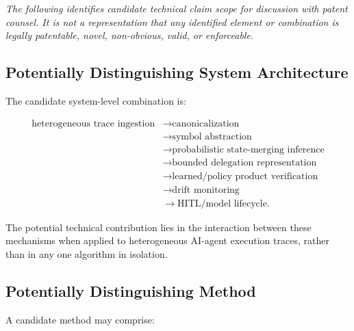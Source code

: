 \documentclass[11pt,a4paper]{article}
\newenvironment{disclaimerbox}
{\begin{center}
 \begin{minipage}{0.95\textwidth}
 \small\itshape\color{tracegray}}
{\end{minipage}
 \end{center}}
\begin{document}
\begin{disclaimerbox}
The following identifies candidate technical claim scope for discussion with patent
counsel. It is not a representation that any identified element or combination is
legally patentable, novel, non-obvious, valid, or enforceable.
\end{disclaimerbox}

\subsection{Potentially Distinguishing System Architecture}

The candidate system-level combination is:

\begin{align*}
\text{heterogeneous trace ingestion}
&\rightarrow \text{canonicalization} \\
&\rightarrow \text{symbol abstraction} \\
&\rightarrow \text{probabilistic state-merging inference} \\
&\rightarrow \text{bounded delegation representation} \\
&\rightarrow \text{learned/policy product verification} \\
&\rightarrow \text{drift monitoring} \\
&\rightarrow \text{HITL/model lifecycle}.
\end{align*}

The potential technical contribution lies in the interaction between these mechanisms
when applied to heterogeneous AI-agent execution traces, rather than in any one algorithm
in isolation.

\subsection{Potentially Distinguishing Method}

A candidate method may comprise:
\end{document}
